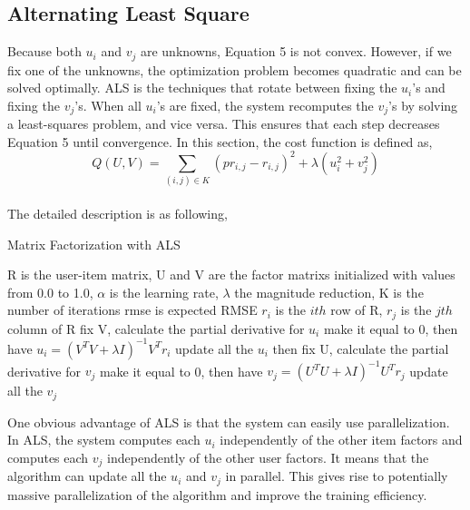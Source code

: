 \documentclass{sig-alternate-05-2015}
\begin{document}
\subsection{Alternating Least Square}
Because both $u_{i}$ and $v_{j}$ are unknowns, Equation 5 is not convex. However, if we fix one of the unknowns, the optimization problem becomes quadratic and can be solved optimally.
ALS is the techniques that rotate between fixing the  $u_{i}$'s and fixing the  $v_{j}$'s. When all  $u_{i}$'s are fixed, the system
recomputes the  $v_{j}$'s by solving a least-squares problem, and vice versa. This ensures that each step decreases Equation 5 until convergence. In this section, the cost function is defined as,\\
           \begin{equation}
     		Q(U, V)= {\sum\limits_{(i,j) \in K} {(pr_{i,j} - r_{i,j})}^{2} + \lambda(u_{i}^{2} + v_{j}^{2}) }
			\end{equation}
\\The detailed description is as following, \\
\begin{algorithm}
    \caption{Matrix Factorization with ALS}

    \begin{algorithmic}[2]
        \Require
            \Statex R is the user-item matrix,
            \Statex U and V are the factor matrixs initialized with values from 0.0 to 1.0,
            \Statex $\alpha$ is the learning rate,
            \Statex $\lambda$ the magnitude reduction,
            \Statex K is the number of iterations
            \Statex rmse is expected RMSE
            \Statex $r_i$ is the $ith$ row of R, $r_j$ is the $jth$ column of R
        \State fix V, calculate the partial derivative for $u_i$
        \State make it equal to 0, then have
        \State $u_i = (V^TV+ \lambda I)^{-1}V^Tr_i$
        \State update all the $u_i$
        \State then fix U, calculate the partial derivative for $v_j$
        \State make it equal to 0, then have
        \State $v_j = (U^TU+ \lambda I)^{-1}U^Tr_j$
        \State update all the $v_j$
    \EndFor
    \end{algorithmic}
\end{algorithm}

One obvious advantage of ALS is that the system can easily use parallelization. In ALS,
the system computes each $u_i$ independently of the other item factors and computes each $v_j$ independently of the other user factors.
It means that the algorithm can update all the $u_i$ and $v_j$ in parallel. This gives rise to potentially massive parallelization of the algorithm and improve the training efficiency.
\end{document}
